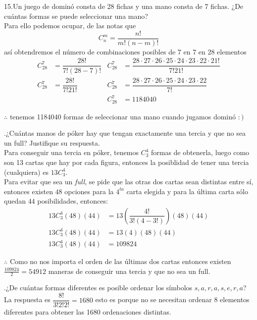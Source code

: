 \documentclass[letterpaper]{article}
\renewcommand{\*}{\cdot}
\theoremstyle{definition}
\begin{document}
\noindent15.Un juego de dominó consta de 28 fichas y una mano consta de 7 fichas.
¿De cuántas formas se puede seleccionar una mano?\\
Para ello podemos ocupar, de las notas que 
\[ C_n^m = \dfrac{n!}{m!(n - m)!} \]así obtendremos el número de combinaciones posibles de 7 en 7 en 28 elementos
\begin{align*}
	C_{28}^7 &= \dfrac{28!}{7!(28 - 7)!} & C_{28}^7 &= \dfrac{28\* 27 \* 26 \* 25 \* 24 \* 23 \* 22 \* 21!}{7!21!}\\
	C_{28}^7 &= \dfrac{28!}{7!21!} & 	C_{28}^7 &= \dfrac{28\* 27 \* 26 \* 25 \* 24 \* 23 \* 22 }{7!}\\
	&  & C_{28}^7 &= 1184040
\end{align*}
\begin{center}
	$ \therefore $ tenemos 1184040 formas de seleccionar una mano cuando jugamos dominó $ :) $
\end{center}
.¿Cuántas manos de póker hay que tengan exactamente una tercia y que no sea un full? Justifique su respuesta.\\
Para conseguir una tercia en póker, tenemos $ C_3^4 $ formas de obtenerla, luego como son 13 cartas que hay por cada figura, entonces la posiblidad de tener una tercia (cualquiera) es $ 13 C_3^4  $.\\
Para evitar que sea un \textit{full}, se pide que las otras dos cartas sean distintas entre sí, entonces existen $ 48 $ opciones para la $ 4^{ta} $ carta elegida y para la última carta sólo quedan $ 44 $ posibilidades, entonces:
\begin{align*}
	13 C_3^4 (48)(44) &= 13 \left( \dfrac{4!}{3!(4-3!)} \right)(48)(44)\\
	13 C_3^4 (48)(44) &= 13(4)(48)(44)\\
	13 C_3^4 (48)(44) &= 109824
\end{align*}
\begin{center}
	$ \therefore $ Como no nos importa el orden de las últimas dos cartas entonces existen $ \frac{109824}{2} = 54912  $ maneras de conseguir una tercia y que no sea un full.
\end{center}
.¿De cuántas formas diferentes es posible ordenar los símbolos $ s,a,r,a,s,e,r,a $?\\
La respuesta es $ \dfrac{8!}{3!2!2!} =1680 $ esto es porque no se necesitan ordenar 8 elementos diferentes para obtener las 1680 ordenaciones distintas.\\
\end{document}
